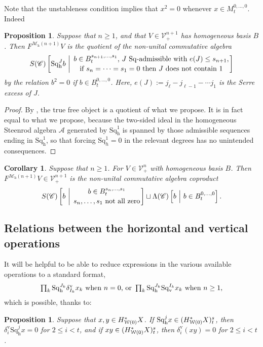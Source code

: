 \documentclass[11pt]{amsart} \renewcommand{\baselinestretch}{1.2}
\theoremstyle{plain}
\newtheorem{prop}[thm]{Proposition}
\newtheorem{cor}[thm]{Corollary}
\numberwithin{equation}{section} %
\theoremstyle{plain}
\newtheorem{prop}[thm]{Proposition}
\newtheorem{cor}[thm]{Corollary}
\numberwithin{equation}{chapter} %
\newcommand{\scrC}{\mathscr{C}}
\newcommand{\calA}{\mathcal{A}}
\newcommand{\calV}{\mathcal{V}}
\newcommand{\calw}{\mathcal{W}}
\newcommand{\calMh}{\mathcal{M}\dhor}
\newcommand{\citeBOX}[2][]{\cite[\mbox{#1}]{#2}}
\newcommand{\CommOperad}{{\scrC}}
\newcommand{\vect}[2]{\calV^{#1}_{#2}}
\newcommand{\excess}{e}
\newcommand{\Sq}{\mathrm{Sq}}
\newcommand{\LieSteen}{\calA}
\newcommand{\uver}{^\mathrm{v}}
\newcommand{\dver}{_\mathrm{v}}
\newcommand{\dhor}{_\mathrm{h}}
\newcommand{\Sqh}{\mathrm{Sq}\dhor}
\newcommand{\Sqv}{\mathrm{Sq}\dver}
\newcommand{\deltav}{\delta\uver}
\newcommand{\SubsectionOrSection}[1]{\subsection{#1}}
\begin{document}
\begin{Cohomology Operations for W and U}
Note that the unstableness condition implies that $x^2=0$ whenever $x\in M_t^{0,\ldots,0}$. Indeed
\begin{prop}
\label{basis of free horizontal operations algebra}
Suppose that $n\geq1$, and that $V\in\vect{n+1}{+}$ has homogeneous basis $B$. Then $F^{\calMh(n+1)}V$ is the quotient of the non-unital commutative algebra
\[S(\CommOperad) \left[\Sqh^Jb\ \middle|\ \genfrac{}{}{0pt}{}{b\in B^{s_{n+1},\ldots,s_1}_t\textup{, $J$ $\Sq$-admissible with }\excess(J)\leq s_{n+1},}{\textup{if }s_{n}=\cdots=s_1=0\textup{ then $J$ does not contain 1}}\right]\]
by the relation $b^2=0$ if $b\in B_t^{0,\ldots,0}$. Here, $e(J):=j_\ell-j_{\ell-1}-\cdots j_1$ is the Serre excess of $J$.
\end{prop}
\begin{proof}
By \citeBOX[6.1]{PriddySimplicialLie.pdf}, the true free object is a quotient of what we propose. It is in fact equal to what we propose, because the two-sided ideal in the homogeneous Steenrod algebra $\LieSteen$ generated by $\Sqh^1$ is spanned by those admissible sequences ending in $\Sqh^1$, so that forcing $\Sq^1_h=0$ in the relevant degrees has no unintended consequences. %
\end{proof}
\begin{cor}
\label{basis of free horizontal operations algebra restricted}
Suppose that $n\geq1$. For $V\in\vect{n}{+}$ with homogeneous basis $B$. Then $F^{\calMh(n+1)}V\in\vect{n+1}{+}$ is the non-unital commutative algebra coproduct
\[S(\CommOperad) \left[b\ \middle|\ \genfrac{}{}{0pt}{}{b\in B^{s_{n},\ldots,s_1}_t}{s_{n},\ldots,s_1\textup{ not all zero}}\right]\sqcup\Lambda(\CommOperad) \left[b\ \middle|\ b\in B^{0,\ldots,0}_t\right].\]
\end{cor}
\SubsectionOrSection{Relations between the horizontal and vertical operations}
\label{Relations between the horizontal and vertical operations}
It will be helpful to be able to reduce %
expressions in the various available operations to a standard format,
\[\textstyle\prod_k \Sqh^{J_{k}}\deltav_{I_{k}}x_k\textup{ when $n=0$, or }\prod_k \Sqh^{J_{k}}\Sqv^{I_{k}}x_k\textup{ when $n\geq1$},\]
which is possible, thanks to:
\begin{prop}
\label{rearrange horiz and vert ops}
Suppose that $x,y\in H^*_{\smash{\calw(0)}}X$. If $\Sqh^jx\in (H^*_{\smash{\calw(0)}}X)^{s}_{t}$, then $\deltav_i\Sqh^{j}x=0$ for  $2\leq i<t$, and if $xy\in (H^*_{\smash{\calw(0)}}X)^{s}_{t}$, then $\deltav_i(xy)=0$ for  $2\leq i<t$.


\end{prop}
\end{Cohomology Operations for W and U}
\end{document}
